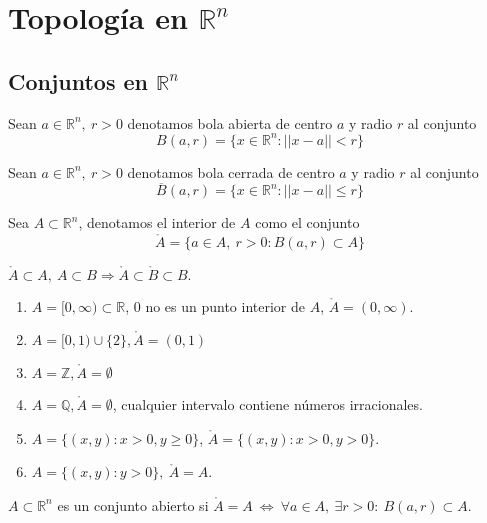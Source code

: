 \chapter{Topología en $\mathbb{R}^n$}
\section{Conjuntos en $\mathbb{R}^n$}
\begin{defn}
Sean $a \in \mathbb{R}^n, \ r>0$ denotamos bola abierta de centro $a$ y radio $r$ al conjunto \[B(a,r) = \{ x \in \mathbb{R}^n : ||x-a|| < r \} \]
\end{defn}


\begin{defn}
Sean $a \in \mathbb{R}^n, \ r>0$ denotamos bola cerrada de centro $a$ y radio $r$ al conjunto \[\overline{B}(a,r) = \{ x \in \mathbb{R}^n : ||x-a|| \leq r \} \]
\end{defn}

\begin{defn}
Sea $A \subset \mathbb{R}^n$, denotamos el interior de $A$ como el conjunto \[ \mathring{A} = \{a \in A, \ r > 0: B(a,r) \subset A  \} \]
\end{defn}

\begin{obs}
$\mathring{A}\subset A, \ A\subset B \Rightarrow \mathring{A}\subset \mathring{B} \subset B.$
\end{obs}

\begin{ejm}
\begin{enumerate}[label=(\roman*)]
    \item $A = [0, \infty) \subset \mathbb{R}$, $0$  no es un punto interior de $A$, $\mathring{A} = (0,\infty)$.
    \item $A = [0,1)\cup \{2\}, \mathring{A}=(0,1)$
    \item $A = \mathbb{Z}, \mathring{A}=\emptyset$
    \item $A = \mathbb{Q}, \mathring{A}=\emptyset$, cualquier intervalo contiene números irracionales.
    \item $A = \{ (x,y): x>0, y \geq 0 \}$, $\mathring{A} = \{ (x,y): x>0, y > 0 \}$.
    \item $A = \{ (x,y): y > 0 \}, \ \mathring{A} = A$.
\end{enumerate}
\end{ejm}


\begin{defn}
$A \subset \mathbb{R}^n $ es un conjunto abierto si $\mathring{A} = A  \ \Leftrightarrow \ \forall a \in A, \ \exists r>0 : \ B(a,r) \subset A$.
\end{defn}

